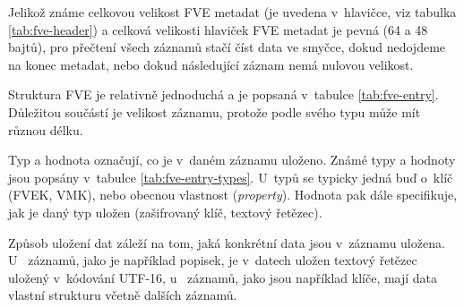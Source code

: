 Jelikož známe celkovou velikost FVE metadat (je uvedena v~hlavičce, viz tabulka \ref{tab:fve-header}) a celková velikosti hlaviček FVE metadat je pevná (64 a 48 bajtů), pro přečtení všech záznamů stačí číst data ve smyčce, dokud nedojdeme na konec metadat, nebo dokud následující záznam nemá nulovou velikost.

Struktura FVE je relativně jednoduchá a je popsaná v~tabulce \ref{tab:fve-entry}. Důležitou součástí je velikost záznamu, protože podle svého typu může mít různou délku.\cite{Kumar2008,Metz2011}


Typ a hodnota označují, co je v~daném záznamu uloženo. Známé typy a hodnoty jsou popsány v~tabulce \ref{tab:fve-entry-types}. U~typů se typicky jedná buď o~klíč (FVEK, VMK), nebo obecnou vlastnost (\emph{property}). Hodnota pak dále specifikuje, jak je daný typ uložen (zašifrovaný klíč, textový řetězec).

Způsob uložení dat záleží na tom, jaká konkrétní data jsou v~záznamu uložena. U~ záznamů, jako je například popisek, je v~datech uložen textový řetězec uložený v~kódování UTF-16, u~ záznamů, jako jsou například klíče, mají data vlastní strukturu včetně dalších záznamů.

